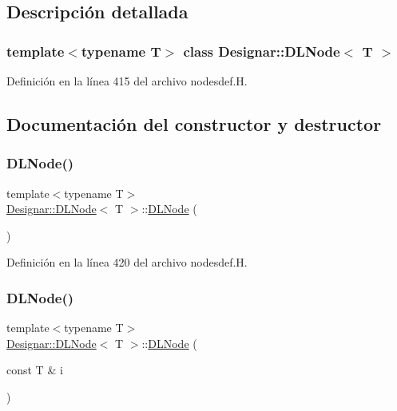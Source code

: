 \subsection{Descripción detallada}
\subsubsection*{template$<$typename T$>$\newline
class Designar\+::\+D\+L\+Node$<$ T $>$}



Definición en la línea 415 del archivo nodesdef.\+H.



\subsection{Documentación del constructor y destructor}
\mbox{\label{class_designar_1_1_d_l_node_aac2adda6b4d737b47d461efe02401f01}} 
\subsubsection{\texorpdfstring{D\+L\+Node()}{DLNode()}\hspace{0.1cm}{\footnotesize\ttfamily [1/5]}}
{\footnotesize\ttfamily template$<$typename T$>$ \\
\hyperlink{class_designar_1_1_d_l_node}{Designar\+::\+D\+L\+Node}$<$ T $>$\+::\hyperlink{class_designar_1_1_d_l_node}{D\+L\+Node} (\begin{DoxyParamCaption}{ }\end{DoxyParamCaption})\hspace{0.3cm}{\ttfamily [inline]}}



Definición en la línea 420 del archivo nodesdef.\+H.

\mbox{\label{class_designar_1_1_d_l_node_af55ccc85dacdef9932b36e1ebd681306}} 
\subsubsection{\texorpdfstring{D\+L\+Node()}{DLNode()}\hspace{0.1cm}{\footnotesize\ttfamily [2/5]}}
{\footnotesize\ttfamily template$<$typename T$>$ \\
\hyperlink{class_designar_1_1_d_l_node}{Designar\+::\+D\+L\+Node}$<$ T $>$\+::\hyperlink{class_designar_1_1_d_l_node}{D\+L\+Node} (\begin{DoxyParamCaption}\item[{const T \&}]{i }\end{DoxyParamCaption})\hspace{0.3cm}{\ttfamily [inline]}}



